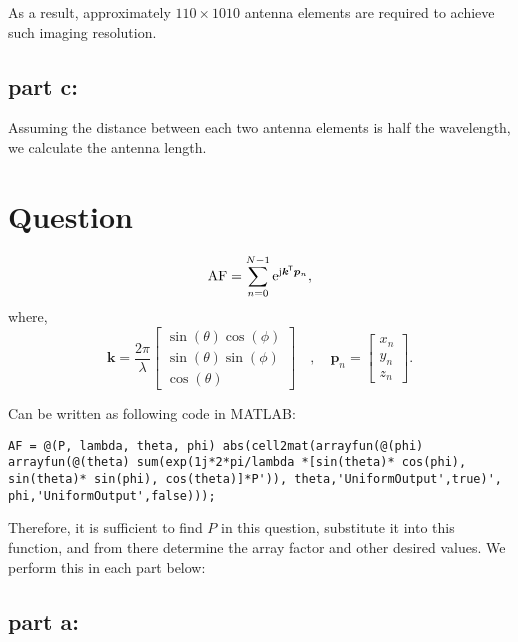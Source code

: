 \documentclass[12pt,onecolumn,a4paper]{article}
\newcommand*{\transpose}{{\mkern-1.5mu\mathsf{T}}}
\newcommand\question{
	\section{Question \numberstringnum{\thesection}}
}
\begin{document}
	
	As a result, approximately $110 \times 1010$ antenna elements are required to achieve such imaging resolution.
	
	
	\FloatBarrier
	\subsection{part c:}

 Assuming the distance between each two antenna elements is half the wavelength, we calculate the antenna length.
	
	
	
	
	
	
	
	
	\FloatBarrier
	\question%
	
	
	\begin{equation}
		\text{AF} = \sum_{n=0}^{N-1} \mathrm{e}^{\mathrm{j}\bm{k}^\transpose\bm{p}_n},
	\end{equation}
	where,
	\begin{equation}
		\bm{k} =
		\frac{2\pi}{\lambda}
		\begin{bmatrix}
			\sin(\theta)\cos(\phi) \\ 	\sin(\theta)\sin(\phi) \\ \cos(\theta)
		\end{bmatrix}
		\quad,\quad
		\bm{p}_n = 
		\begin{bmatrix}
			x_n \\ y_n \\ z_n
		\end{bmatrix}.
	\end{equation}
	
	Can be written as following code in MATLAB: 
	
	\begin{lstlisting}
AF = @(P, lambda, theta, phi) abs(cell2mat(arrayfun(@(phi) arrayfun(@(theta) sum(exp(1j*2*pi/lambda *[sin(theta)* cos(phi), sin(theta)* sin(phi), cos(theta)]*P')), theta,'UniformOutput',true)', phi,'UniformOutput',false)));
	\end{lstlisting}
	
	Therefore, it is sufficient to find $P$ in this question, substitute it into this function, and from there determine the array factor and other desired values. We perform this in each part below:
	
	\FloatBarrier
	\subsection{part a:}
	
\end{document}
